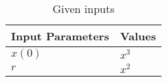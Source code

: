 \begin{table}[htbp]
\centering
\def\arraystrech{1.5}
\begin{tabular}{|p{2.5cm}|p{2.5cm}|}
\hline
	\textbf{Input Parameters} & \textbf{Values} \\
\hline
$x(0)$ & $x^3$\\
\hline
$r$ & $x^2$ \\
\hline
\end{tabular}
\caption{Given inputs}
\label{tab:1.11.9.3.Q10}
\end{table}
